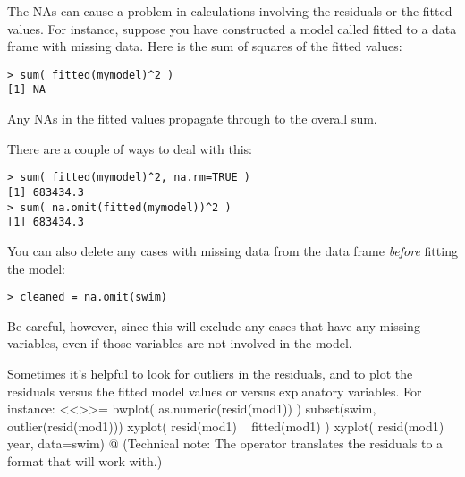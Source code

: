 The NAs can cause a problem in calculations involving the residuals or
the fitted values.  For instance, suppose you have constructed a model
called  fitted to a data frame with missing data.  Here
is the sum of squares of the fitted values:
\begin{verbatim}
> sum( fitted(mymodel)^2 )
[1] NA
\end{verbatim}
Any NAs in the fitted values propagate through to the overall sum.



There are a couple of ways to deal with this:
\begin{verbatim}
> sum( fitted(mymodel)^2, na.rm=TRUE )
[1] 683434.3
> sum( na.omit(fitted(mymodel))^2 )
[1] 683434.3
\end{verbatim}


You can also delete any cases with missing data from the data frame
{\em before} fitting the model:
\begin{verbatim}
> cleaned = na.omit(swim)
\end{verbatim}
Be careful, however, since this will exclude any cases that have any
missing variables, even if those variables are not involved in the model.

Sometimes it's helpful to look for outliers in the residuals, and to plot
the residuals versus the fitted model values or versus explanatory variables.
For instance:
<<>>=
bwplot( as.numeric(resid(mod1)) )
subset(swim, outlier(resid(mod1)))
xyplot( resid(mod1) ~ fitted(mod1) )
xyplot( resid(mod1) ~ year, data=swim)
@ 
(Technical note: The  operator translates the
residuals to a format that  will work with.)

